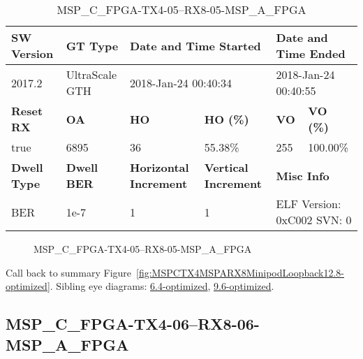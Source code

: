 \begin{table}[h]
\centering
\caption{MSP\_C\_FPGA-TX4-05--RX8-05-MSP\_A\_FPGA}
\label{tab:MSPCFPGATX405RX805MSPAFPGA12.8-optimized}
\begin{tabular}{@{}|l|l|l|l|l|l|@{}}
\toprule
\textbf{SW Version}                & \textbf{GT Type}   & \multicolumn{2}{l|}{\textbf{Date and Time Started}}            & \multicolumn{2}{l|}{\textbf{Date and Time Ended}}        \\ \midrule
2017.2                       & UltraScale GTH          & \multicolumn{2}{l|}{2018-Jan-24 00:40:34}                   & \multicolumn{2}{l|}{2018-Jan-24 00:40:55}               \\ \midrule
\textbf{Reset RX}                  & \textbf{OA} & \textbf{HO}   & \textbf{HO (\%)} & \textbf{VO} & \textbf{VO (\%)} \\ \midrule
true & 6895        & 36          & 55.38\%        & 255        & 100.00\%       \\ \midrule
\textbf{Dwell Type}                & \textbf{Dwell BER} & \textbf{Horizontal Increment} & \textbf{Vertical Increment}    & \multicolumn{2}{l|}{\textbf{Misc Info}}                  \\ \midrule
BER                            & 1e-7        & 1        & 1           & \multicolumn{2}{l|}{ELF Version: 0xC002 SVN: 0}                         \\ \bottomrule
\end{tabular}
\end{table}

\begin{figure}[h]
\caption{MSP\_C\_FPGA-TX4-05--RX8-05-MSP\_A\_FPGA} \label{fig:MSPCFPGATX405RX805MSPAFPGA12.8-optimized}
\end{figure}

Call back to summary Figure~\ref{fig:MSPCTX4MSPARX8MinipodLoopback12.8-optimized}.
Sibling eye diagrams: \hyperref[sec:MSPCFPGATX405RX805MSPAFPGA6.4-optimized]{6.4-optimized}, \hyperref[sec:MSPCFPGATX405RX805MSPAFPGA9.6-optimized]{9.6-optimized}.

\clearpage
\newpage


\subsection{MSP\_C\_FPGA-TX4-06--RX8-06-MSP\_A\_FPGA}\label{sec:MSPCFPGATX406RX806MSPAFPGA12.8-optimized}

